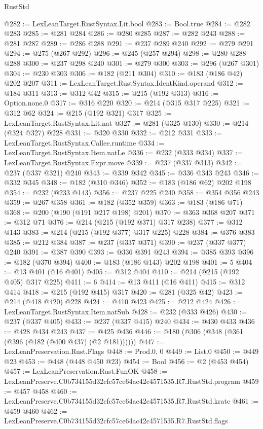 \begin{lexlean}{RustStd}
\begin{coremodule}
@282 := LexLeanTarget.RustSyntax.Lit.bool
@283 := Bool.true
@284 := @282 @283
@285 := @281 @284
@286 := @280 @285
@287 := @282 @243
@288 := @281 @287
@289 := @286 @288
@291 := @237 @289 @240
@292 := @279 @291
@294 := @275 (@267 @292)
@296 := @245 (@257 @294)
@298 := @280 @288 @288
@300 := @237 @298 @240
@301 := @279 @300
@303 := @296 (@267 @301)
@304 := @230 @303
@306 := @182 (@211 @304)
@310 := @183 (@186 @42) @202 @207
@311 := LexLeanTarget.RustSyntax.IdentKind.operand
@312 := @184 @311
@313 := @312 @42
@315 := @215 (@192 @313)
@316 := Option.none.{0}
@317 := @316 @220
@320 := @214 (@315 @317 @225)
@321 := @312 @62
@324 := @215 (@192 @321) @317
@325 := LexLeanTarget.RustSyntax.Lit.nat
@327 := @281 (@325 @130)
@330 := @214 (@324 @327) @228
@331 := @320 @330
@332 := @212 @331
@333 := LexLeanTarget.RustSyntax.Callee.runtime
@334 := LexLeanTarget.RustSyntax.Item.natLe
@336 := @232 (@333 @334)
@337 := LexLeanTarget.RustSyntax.Expr.move
@339 := @237 (@337 @313)
@342 := @237 (@337 @321) @240
@343 := @339 @342
@345 := @336 @343 @243
@346 := @332 @345
@348 := @182 (@310 @346)
@352 := @183 (@186 @62) @202 @198
@354 := @232 (@233 @143)
@356 := @237 @225 @240
@358 := @354 @356 @243
@359 := @267 @358
@361 := @182 (@352 @359)
@363 := @183 (@186 @71)
@368 := @200 (@190 (@191 @217 @198) @201)
@370 := @363 @368 @207
@371 := @312 @71
@376 := @214 (@215 (@192 @371) @317 @238)
@377 := @312 @143
@383 := @214 (@215 (@192 @377) @317 @225) @228
@384 := @376 @383
@385 := @212 @384
@387 := @237 (@337 @371)
@390 := @237 (@337 @377) @240
@391 := @387 @390
@393 := @336 @391 @243
@394 := @385 @393
@396 := @182 (@370 @394)
@400 := @183 (@186 @143) @202 @198
@401 := 5
@404 := @13 @401 (@16 @401)
@405 := @312 @404
@410 := @214 (@215 (@192 @405) @317 @225)
@411 := 6
@414 := @13 @411 (@16 @411)
@415 := @312 @414
@418 := @215 (@192 @415) @317
@420 := @281 (@325 @42)
@423 := @214 (@418 @420) @228
@424 := @410 @423
@425 := @212 @424
@426 := LexLeanTarget.RustSyntax.Item.natSub
@428 := @232 (@333 @426)
@430 := @237 (@337 @405)
@433 := @237 (@337 @415) @240
@434 := @430 @433
@436 := @428 @434 @243
@437 := @425 @436
@446 := @180 (@306 (@348 (@361 (@396 (@182 (@400 @437) (@2 @181))))))
@447 := LexLeanPreservation.Rust.Flags
@448 := Prod.{0, 0}
@449 := List.{0}
@450 := @449 @23
@453 := @448 (@448 @450 @23)
@454 := Bool
@456 := @2 (@453 @454)
@457 := LexLeanPreservation.Rust.FunOK
@458 := LexLeanPreserve.C0b734155d32cfc57ce64ac42c4571535.R7.RustStd.program
@459 := @457 @458
@460 := LexLeanPreserve.C0b734155d32cfc57ce64ac42c4571535.R7.RustStd.krate
@461 := @459 @460
@462 := LexLeanPreserve.C0b734155d32cfc57ce64ac42c4571535.R7.RustStd.flags

\end{coremodule}
\end{lexlean}
